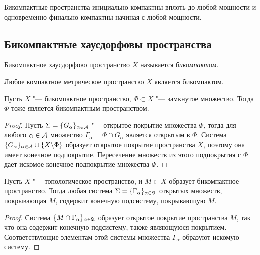 \begin{note}
    Бикомпактные пространства инициально компактны вплоть до любой мощности и одновременно финально компактны начиная с любой мощности.
\end{note} 

\subsection{Бикомпактные хаусдорфовы пространства}

\begin{definition}
    Бикомпактное хаусдорфово пространство $X$ называется \textit{бикомпактом}.
\end{definition}

\begin{note}
    Любое компактное метрическое пространство $X$ является бикомпактом.
\end{note}

\begin{proposition}
    Пусть $X$ "--- бикомпактное пространство, $\Phi \subset X$ "--- замкнутое множество. Тогда $\Phi$ тоже является бикомпактным пространством.
\end{proposition}

\begin{proof}
    Пусть $\Sigma = \lbrace G_{\alpha}\rbrace_{\alpha \in \mathcal A}$ "--- открытое покрытие множества $\Phi$, тогда для любого $\alpha \in \mathcal A$ множество $\Gamma_{\alpha} = \Phi\cap G_{\alpha}$ является открытым в $\Phi$. Система $\lbrace G_{\alpha}\rbrace_{\alpha \in \mathcal A} \cup \lbrace X\backslash \Phi\rbrace$ образует открытое покрытие пространства $X$, поэтому она имеет конечное подпокрытие. Пересечение множеств из этого подпокрытия с $\Phi$ дает искомое конечное подпокрытие множества $\Phi$.
\end{proof}

\begin{proposition}
    Пусть $X$ "--- топологическое пространство, и $M \subset X$ образует бикомпактное пространство. Тогда любая система $\Sigma = \lbrace \Gamma_{\alpha}\rbrace_{\alpha \in \mathfrak A}$ открытых множеств, покрывающая $M$, содержит конечную подсистему, покрывающую $M$.
\end{proposition}

\begin{proof}
    Система $\lbrace M\cap \Gamma_{\alpha}\rbrace_{\alpha \in \mathfrak A}$ образует открытое покрытие пространства $M$, так что она содержит конечную подсистему, также являющуюся покрытием. Соответствующие элементам этой системы множества $\Gamma_{\alpha}$ образуют искомую систему.
\end{proof}

